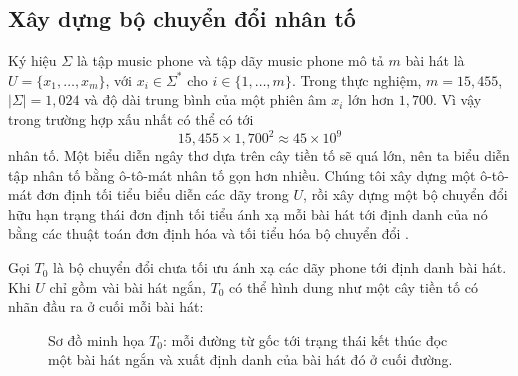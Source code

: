 \documentclass[11pt]{article}
\newcommand{\eps}{\epsilon}
\begin{document}
\subsection{Xây dựng bộ chuyển đổi nhân tố}

Ký hiệu $\Sigma$ là tập music phone và tập dãy music phone mô tả $m$ bài hát
là $U=\{x_1,\ldots,x_m\}$, với $x_i\in\Sigma^*$ cho
$i\in\{1,\ldots,m\}$. Trong thực nghiệm, $m=15{,}455$, $|\Sigma|=1{,}024$ và
độ dài trung bình của một phiên âm $x_i$ lớn hơn $1{,}700$. Vì vậy trong
trường hợp xấu nhất có thể có tới
\[
  15{,}455\times 1{,}700^2 \approx 45\times 10^9
\]
nhân tố. Một biểu diễn ngây thơ dựa trên cây tiền tố sẽ quá lớn, nên ta biểu
diễn tập nhân tố bằng ô-tô-mát nhân tố gọn hơn nhiều. Chúng tôi xây dựng một
ô-tô-mát đơn định tối tiểu biểu diễn các dãy trong $U$, rồi xây dựng một bộ
chuyển đổi hữu hạn trạng thái đơn định tối tiểu ánh xạ mỗi bài hát tới định
danh của nó bằng các thuật toán đơn định hóa và tối tiểu hóa bộ chuyển đổi
\cite{mohri-transducers,mohri-applied}.

Gọi $T_0$ là bộ chuyển đổi chưa tối ưu ánh xạ các dãy phone tới định danh bài
hát. Khi $U$ chỉ gồm vài bài hát ngắn, $T_0$ có thể hình dung như một cây tiền
tố có nhãn đầu ra ở cuối mỗi bài hát:

\begin{figure}[ht]
\centering
{}
\caption{Sơ đồ minh họa \(T_0\): mỗi đường từ gốc tới trạng thái kết thúc đọc một bài hát ngắn và xuất định danh của bài hát đó ở cuối đường.}
\end{figure}
\end{document}
